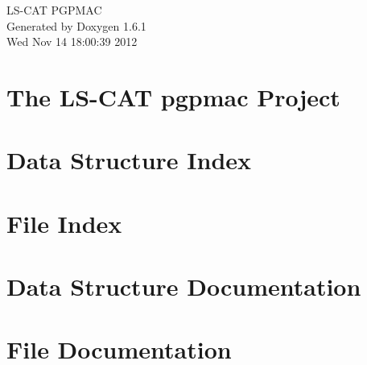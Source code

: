 \documentclass[a4paper]{book}
\begin{document}
\hypersetup{pageanchor=false}
\begin{titlepage}
\vspace*{7cm}
\begin{center}
{\Large LS-\/CAT PGPMAC }\\
\vspace*{1cm}
{\large Generated by Doxygen 1.6.1}\\
\vspace*{0.5cm}
{\small Wed Nov 14 18:00:39 2012}\\
\end{center}
\end{titlepage}
\clearemptydoublepage
{}
\tableofcontents
\clearemptydoublepage
{}
\hypersetup{pageanchor=true}
\chapter{The LS-\/CAT pgpmac Project}
\label{index}\hypertarget{index}{}
\chapter{Data Structure Index}

\chapter{File Index}

\chapter{Data Structure Documentation}
















\chapter{File Documentation}










\printindex
\end{document}
